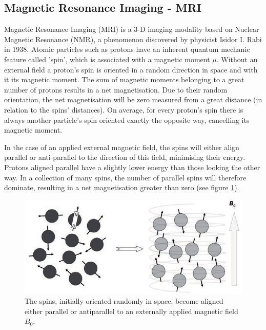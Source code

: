 \subsection{Magnetic Resonance Imaging - MRI}
Magnetic Resonance Imaging (MRI) is a 3-D imaging modality based on Nuclear Magnetic Resonance (NMR), a phenomenon discovered by physicist Isidor I. Rabi in 1938.
Atomic particles such as protons have an inherent quantum mechanic feature called 'spin', which is associated with a magnetic moment $\mu$.
Without an external field a proton's spin is oriented in a random direction in space and with it its magnetic moment.
The sum of magnetic moments belonging to a great number of protons results in a net magnetisation.
Due to their random orientation, the net magnetisation will be zero measured from a great distance (in relation to the spins' distances).
On average, for every proton's spin there is always another particle's spin oriented exactly the opposite way, cancelling its magnetic moment.

In the case of an applied external magnetic field, the spins will either align parallel or anti-parallel to the direction of this field, minimising their energy.
Protons aligned parallel have a slightly lower energy than those looking the other way.
In a collection of many spins, the number of parallel spins will therefore dominate, resulting in a net magnetisation greater than zero (see figure \ref{fig:spin_align}).

\begin{figure}[h!]
\centering
\includegraphics[width=0.8\linewidth]{../fig/intro/spin_align}
\caption{The spins, initially oriented randomly in space, become aligned either parallel or antiparallel to an externally applied magnetic field $B_0$.}
\label{fig:spin_align}
\end{figure}

